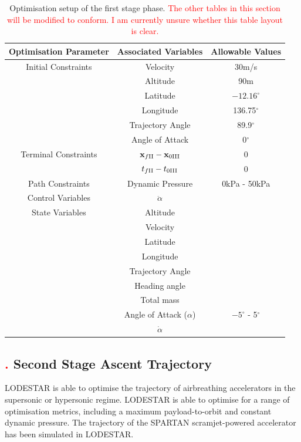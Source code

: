 \begin{table}[ht]
\centering
\begin{tabular}{|c|c|c|}
	\hline Optimisation Parameter  & Associated Variables & Allowable Values\\
	\hline Initial Constraints  & Velocity & 30m/s\\ & Altitude& 90m \\ & Latitude & $-12.16^\circ$ \\& Longitude & 136.75$^\circ$\\ & Trajectory Angle & 89.9$^\circ$\\ & Angle of Attack& 0$^\circ$\\
	\hline Terminal Constraints & $\textbf{x}_{f\textrm{\rom{2}}} - \textbf{x}_{0\textrm{\rom{3}}}$ & 0\\ & $t_{f\textrm{\rom{2}}} - t_{0\textrm{\rom{3}}}$ & 0\\
	\hline Path Constraints & Dynamic Pressure & 0kPa - 50kPa\\ 
		\hline Control Variables & $\ddot{\alpha}$ &\\ 
		\hline State Variables & Altitude & \\ & Velocity& \\  & Latitude& \\  & Longitude& \\  & Trajectory Angle& \\  & Heading angle& \\  & Total mass& \\  & Angle of Attack ($\alpha$)&  $-5^\circ$ - 5$^\circ$\\  & $\dot{\alpha}$& \\ 
	\hline 
\end{tabular} 

\caption{Optimisation setup of the first stage phase. \textcolor{red}{The other tables in this section will be modified to conform. I am currently unsure whether this table layout is clear.}}

\end{table}



\subsection{\textcolor{red}{.} Second Stage Ascent Trajectory}




LODESTAR is able to optimise the trajectory of airbreathing accelerators in the supersonic or hypersonic regime. LODESTAR is able to optimise for a range of optimisation metrics, including a maximum payload-to-orbit and constant dynamic pressure.  
The trajectory of the SPARTAN scramjet-powered accelerator has been simulated in LODESTAR. 

